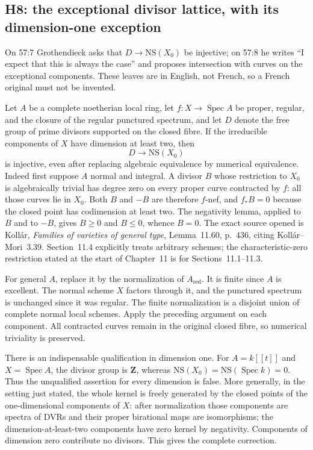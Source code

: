 \subsection{H8: the exceptional divisor lattice, with its dimension-one exception}

On 57:7 Grothendieck asks that $D\to\mathrm{NS}(X_0)$ be injective; on 57:8
he writes ``I expect that this is always the case'' and proposes intersection
with curves on the exceptional components. These leaves are in English, not
French, so a French original must not be invented.

Let $A$ be a complete noetherian local ring, let
$f:X\to\operatorname{Spec}A$ be proper, regular, and the closure of the
regular punctured spectrum, and let $D$ denote the free group of prime
divisors supported on the closed fibre. If the irreducible components of
$X$ have dimension at least two, then
\[
 D\longrightarrow\mathrm{NS}(X_0)
\]
is injective, even after replacing algebraic equivalence by numerical
equivalence. Indeed first suppose $A$ normal and integral. A divisor $B$
whose restriction to $X_0$ is algebraically trivial has degree zero on every
proper curve contracted by $f$: all those curves lie in $X_0$. Both $B$ and
$-B$ are therefore $f$-nef, and $f_*B=0$ because the closed point has
codimension at least two. The negativity lemma, applied to $B$ and to $-B$,
gives $B\geq0$ and $B\leq0$, whence $B=0$.
The exact source opened is Koll\'ar, \emph{Families of varieties of general
type}, Lemma~11.60, p.~436, citing Koll\'ar--Mori~3.39. Section~11.4 explicitly
treats arbitrary schemes; the characteristic-zero restriction stated at the
start of Chapter~11 is for Sections~11.1--11.3.

For general $A$, replace it by the normalization of $A_{\mathrm{red}}$.
It is finite since $A$ is excellent. The normal scheme $X$ factors through
it, and the punctured spectrum is unchanged since it was regular. The finite
normalization is a disjoint union of complete normal local schemes. Apply the
preceding argument on each component. All contracted curves remain in the
original closed fibre, so numerical triviality is preserved.

There is an indispensable qualification in dimension one. For
$A=k[[t]]$ and $X=\operatorname{Spec}A$, the divisor group is $\mathbf Z$,
whereas $\mathrm{NS}(X_0)=\mathrm{NS}(\operatorname{Spec}k)=0$. Thus the
unqualified assertion for every dimension is false. More generally, in the
setting just stated, the whole kernel is freely generated by the closed points
of the one-dimensional components of $X$: after normalization those components
are spectra of DVRs and their proper birational maps are isomorphisms; the
dimension-at-least-two components have zero kernel by negativity. Components
of dimension zero contribute no divisors. This gives the complete correction.

